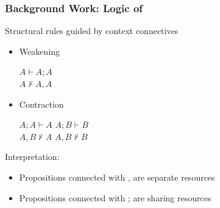 \begin{frame}[c]
  \frametitle{Background Work: Logic of \BI{}}
  \begin{center}
  Structural rules guided by context connectives

  \begin{itemize}
  \item Weakening
    \begin{center}
      $A \vdash A;A$\\
      $A \not\vdash A,A$
    \end{center}

  \item Contraction
    \begin{center}
      $A;A \vdash A$ \qquad $A;B \vdash B$\\
      $A,B \not\vdash A$ \qquad $A,B \not\vdash B$
    \end{center}
  \end{itemize}

  Interpretation:
  \begin{itemize}
  \item Propositions connected with , are separate resources
  \item Propositions connected with ; are sharing resources
\end{itemize}
\end{center}

\end{frame}

